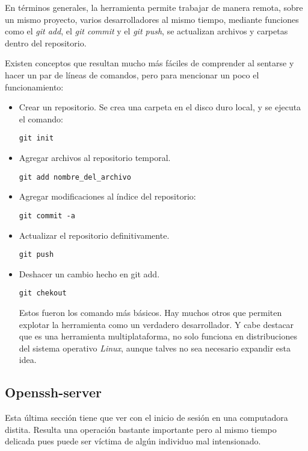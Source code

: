 \documentclass{article}
\begin{document}
\bigskip

En t\' erminos generales, la herramienta permite trabajar de manera remota, sobre un mismo proyecto, varios desarrolladores al mismo tiempo, mediante funciones como el \textit{git add}, el \textit{git commit} y el \textit{git push}, se actualizan archivos y carpetas dentro del repositorio.

\bigskip

Existen conceptos que resultan mucho m\' as f\' aciles de comprender al sentarse y hacer un par de l\' ineas de comandos, pero para mencionar un poco el funcionamiento:

\begin{itemize}
\item Crear un repositorio. Se crea una carpeta en el disco duro local, y se ejecuta el comando:
\begin{verbatim}
git init
\end{verbatim}

\item Agregar archivos al repositorio temporal.
\begin{verbatim}
git add nombre_del_archivo
\end{verbatim}

\item Agregar modificaciones al \' indice del repositorio:
\begin{verbatim}
git commit -a
\end{verbatim}

\item Actualizar el repositorio definitivamente.
\begin{verbatim}
git push
\end{verbatim}

\item Deshacer un cambio hecho en git add.
\begin{verbatim}
git chekout
\end{verbatim}

Estos fueron los comando m\' as b\' asicos. Hay muchos otros que permiten explotar la herramienta como un verdadero desarrollador. Y cabe destacar que es una herramienta multiplataforma, no solo funciona en distribuciones del sistema operativo \textit{Linux}, aunque talves no sea necesario expandir esta idea.
\end{itemize}

\subsection*{Openssh-server}
Esta \' ultima secci\' on tiene que ver con el inicio de sesi\' on en una computadora distita.
Resulta una operaci\' on bastante importante pero al mismo tiempo delicada pues puede ser v\' ictima de alg\' un individuo mal intensionado.
\end{document}
